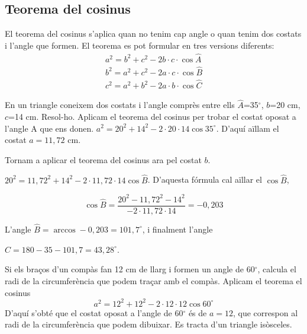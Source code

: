 \subsection{Teorema del cosinus}

\begin{theorybox}
	
	El teorema del cosinus s'aplica quan no tenim cap angle o quan tenim dos costats i l'angle que formen.
	El teorema es pot formular en tres versions diferents:
	\begin{eqnarray*}
		a^2 = b^2 + c^2 - 2  b \cdot c \cdot \cos\hat A \\
		b^2 = a^2 + c^2 - 2 a \cdot c\cdot \cos \hat B \\
		c^2 = a^2 + b^2 - 2 a \cdot b\cdot \cos \hat C 
	\end{eqnarray*}
	
	
\end{theorybox}


\begin{resolt}[E]{ En un triangle coneixem dos costats i l'angle comprès entre ells $\hat A$=35${}^\circ$, $b$=20 cm, $c$=14 cm. Resol-ho.}
	Aplicam el teorema del cosinus per trobar el costat oposat a l'angle A que ens donen. $a^2 = 20^2 + 14^2 - 2 \cdot 20 \cdot 14 \cos 35^\circ$.
	D'aquí aïllam el costat $a=11,72$ cm.
	
	Tornam a aplicar el teorema del cosinus ara pel costat $b$.
	
	$20^2 = 11,72^2 + 14^2 - 2 \cdot 11,72 \cdot 14 \cos \hat B$. D'aquesta fórmula cal aïllar el $\cos \hat B$,
	
	\begin{equation*}
	\cos \hat B = \dfrac{20^2 - 11,72^2 - 14^2}{-2 \cdot 11,72 \cdot 14}=-0,203
	\end{equation*}
	
	L'angle $\hat B=\arccos -0,203 = 101,7^\circ$, i finalment l'angle 
	
	 $\hat C=180-35-101,7=43,28^\circ$.
\end{resolt}

\begin{resolt}{Si els braços d'un compàs fan 12 cm de llarg i formen un angle de 60${}^\circ$, calcula el radi de la circumferència que podem traçar amb el compàs.}
	Aplicam el teorema el cosinus
	\begin{equation*}
	a^2 = 12^2 + 12^2 - 2 \cdot 12 \cdot 12 \cos 60^\circ
	\end{equation*}
	D'aquí s'obté que el costat oposat a l'angle de 60${}^\circ$ és de $a=12$, que correspon al radi
	de la circumferència que podem dibuixar. Es tracta d'un triangle isòsceles.
\end{resolt}

